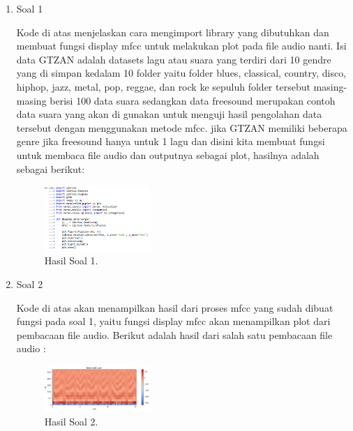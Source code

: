 \begin{enumerate}
	\item Soal 1
	\hfill\break
	
	Kode di atas menjelaskan cara mengimport library yang dibutuhkan dan membuat fungsi display mfcc untuk melakukan plot pada file audio nanti. Isi data GTZAN adalah datasets lagu atau suara yang terdiri dari 10 gendre yang di simpan kedalam 10 folder yaitu folder blues, classical, country, disco, hiphop, jazz, metal, pop, reggae, dan rock ke sepuluh folder tersebut masing-masing  berisi 100 data suara sedangkan data freesound merupakan contoh data suara yang akan di gunakan untuk menguji hasil pengolahan data tersebut dengan menggunakan metode mfcc. jika GTZAN memiliki beberapa genre jika freesound hanya untuk 1 lagu dan disini kita membuat fungsi untuk membaca file audio dan outputnya sebagai plot, hasilnya adalah sebagai berikut:
	\begin{figure}[H]
	\centering
		\includegraphics[width=4cm]{figures/1174087/6/8.png}
		\caption{Hasil Soal 1.}
	\end{figure}

	\item Soal 2
	\hfill\break
	
	Kode di atas akan menampilkan hasil dari proses mfcc yang sudah dibuat fungsi pada soal 1, yaitu fungsi display mfcc akan menampilkan plot dari pembacaan file audio. Berikut adalah hasil dari salah satu pembacaan file audio :
	\begin{figure}[H]
	\centering
		\includegraphics[width=4cm]{figures/1174087/6/9.png}
		\caption{Hasil Soal 2.}
	\end{figure}


\end{enumerate}
